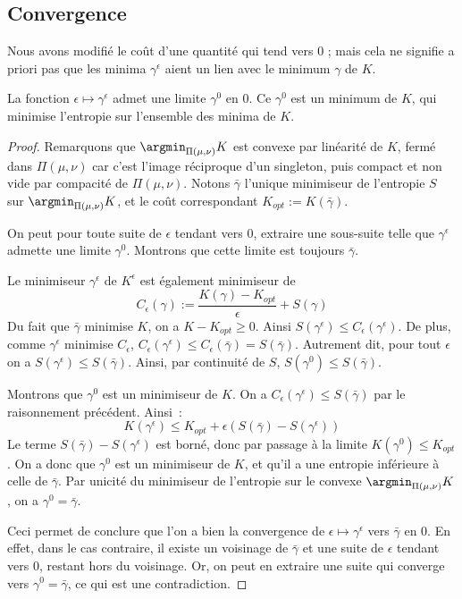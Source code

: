 \subsection{Convergence}
Nous avons modifié le coût d'une quantité qui tend vers 0 ; mais cela ne signifie a priori pas que les minima $\gamma^\epsilon$ aient un lien avec le minimum $\gamma$ de $K$.
\begin{lemma}
La fonction $\epsilon \mapsto \gamma^\epsilon$ admet une limite $\gamma^0$ en 0.
Ce $\gamma^0$ est un minimum de $K$, qui minimise l'entropie sur l'ensemble des minima de $K$.
\end{lemma}
\begin{proof}
Remarquons que $\argmin_{\Pi(\mu,\nu)} K$ est convexe par linéarité de $K$, fermé dans $\Pi(\mu,\nu)$ car c'est l'image réciproque d'un singleton, puis compact et non vide par compacité de $\Pi(\mu,\nu)$.
Notons $\bar{\gamma}$ l'unique minimiseur de l'entropie $S$ sur $\argmin_{\Pi(\mu,\nu)} K$, et le coût correspondant $K_{opt} := K(\bar{\gamma})$.

On peut pour toute suite de $\epsilon$ tendant vers 0, extraire une sous-suite telle que $\gamma^\epsilon$ admette une limite $\gamma^0$. Montrons que cette limite est toujours $\bar{\gamma}$.

Le minimiseur $\gamma^\epsilon$ de $K^\epsilon$ est également minimiseur de 
\[C_\epsilon(\gamma) := \frac{K(\gamma) - K_{opt}}{\epsilon} + S(\gamma) \]
Du fait que $\bar{\gamma}$ minimise $K$, on a $K - K_{opt} \ge 0$. Ainsi $S(\gamma^\epsilon) \le C_\epsilon(\gamma^\epsilon)$. De plus, comme $\gamma^\epsilon$ minimise $C_\epsilon$, $C_\epsilon(\gamma^\epsilon) \le C_\epsilon(\bar{\gamma}) = S(\bar{\gamma})$. Autrement dit, pour tout $\epsilon$ on a $S(\gamma^\epsilon) \le S(\bar{\gamma})$. Ainsi, par continuité de $S$, $S(\gamma^0) \le S(\bar{\gamma})$.

Montrons que $\gamma^0$ est un minimiseur de $K$. On a $C_\epsilon(\gamma^\epsilon) \le S(\bar{\gamma})$ par le raisonnement précédent. Ainsi~:
\[K(\gamma^\epsilon) \le K_{opt} + \epsilon (S(\bar{\gamma}) - S(\gamma^\epsilon)) \]
Le terme $S(\bar{\gamma}) - S(\gamma^\epsilon)$ est borné, donc par passage à la limite $K(\gamma^0) \le K_{opt}$. On a donc que $\gamma^0$ est un minimiseur de $K$, et qu'il a une entropie inférieure à celle de $\bar{\gamma}$. Par unicité du minimiseur de l'entropie sur le convexe $\argmin_{\Pi(\mu,\nu)} K$, on a $\gamma^0 = \bar{\gamma}$.

Ceci permet de conclure que l'on a bien la convergence de $\epsilon \mapsto \gamma^\epsilon$ vers $\bar{\gamma}$ en 0. En effet, dans le cas contraire, il existe un voisinage de $\bar{\gamma}$ et une suite de $\epsilon$ tendant vers 0, restant hors du voisinage. Or, on peut en extraire une suite qui converge vers $\gamma^0 = \bar{\gamma}$, ce qui est une contradiction.
\end{proof}

